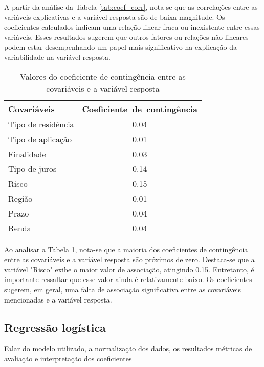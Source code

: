 A partir da análise da Tabela \ref{tab:coef_corr}, nota-se que as correlações entre as 
variáveis explicativas e a variável resposta são de baixa magnitude. Os coeficientes 
calculados indicam uma relação linear fraca ou inexistente entre essas variáveis. 
Esses resultados sugerem que outros fatores ou relações não lineares podem estar desempenhando 
um papel mais significativo na explicação da variabilidade na variável resposta.
  
\begin{table}[H]
  \centering
  \begin{tabular}{lc}
    \hline
    \textbf{Covariáveis} & \mbox{\textbf{Coeficiente de contingência}} \\ 
    \hline
    Tipo de residência & 0.04 \\ 
    Tipo de aplicação & 0.01 \\ 
    Finalidade & 0.03 \\ 
    Tipo de juros & 0.14 \\ 
    Risco & 0.15 \\ 
    Região & 0.01 \\ 
    Prazo & 0.04 \\
    Renda &  0.04 \\
     \hline
  \end{tabular}
  \caption{Valores do coeficiente de contingência entre as covariáveis e a variável resposta}
  \label{tab:coef_cont}
\end{table}

Ao analisar a Tabela \ref{tab:coef_cont}, nota-se que a maioria dos coeficientes de contingência entre as 
covariáveis e a variável resposta são próximos de zero. Destaca-se que a variável "Risco"
exibe o maior valor de associação, atingindo 0.15. Entretanto, é importante ressaltar que esse valor
ainda é relativamente baixo. Os coeficientes sugerem, em geral, uma falta de associação significativa 
entre as covariáveis mencionadas e a variável resposta.


\subsection{Regressão logística}

Falar do modelo utilizado, a normalização dos dados, os resultados
métricas de avaliação e interpretação dos coeficientes



